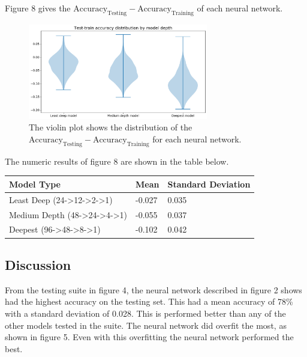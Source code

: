 \documentclass[12pt]{article}
\begin{document}
Figure 8 gives the $\text{Accuracy}_{\text{Testing}} - \text{Accuracy}_{\text{Training}}$ of each neural network. 
\begin{figure}[H]
\centering
\includegraphics[width=0.7\textwidth]{testOut1289}
\caption{The violin plot shows the distribution of the $\text{Accuracy}_{\text{Testing}} - \text{Accuracy}_{\text{Training}}$
for each neural network. }
\end{figure}

The numeric results of figure 8 are shown in the table below.

\begin{table}[H]
\centering
\begin{tabular}{l|l|l}
\hline
\multicolumn{1}{|l|}{Model Type}                                   & Mean   & \multicolumn{1}{l|}{Standard Deviation} \\ \hline
Least Deep (24-\textgreater{}12-\textgreater{}2-\textgreater{}1)   & -0.027 & 0.035                                   \\
Medium Depth (48-\textgreater{}24-\textgreater{}4-\textgreater{}1) & -0.055 & 0.037                                   \\
Deepest (96-\textgreater{}48-\textgreater{}8-\textgreater{}1)      & -0.102 & 0.042                                  
\end{tabular}
\end{table}

\subsection{Discussion}

From the testing suite in figure 4, the neural network described in figure 2 shows had the highest accuracy on the testing set.  This had a mean accuracy of 78\% with a standard deviation of 0.028.  This is performed better than any of the other models tested in the suite.  The neural network did overfit the most, as shown in figure 5.  Even with this overfitting the neural network performed the best. 
\end{document}
